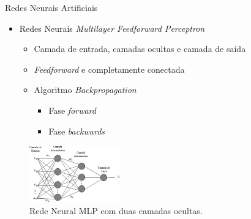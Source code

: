\begin{frame}{Redes Neurais Artificiais}
   \ \  \\[0.1cm]
   \begin{itemize}
        \item Redes Neurais \alert{\emph{Multilayer Feedforward Perceptron}}
        \begin{itemize}
          \item Camada de entrada, camadas ocultas e camada de saída
          \item \emph{Feedforward} e completamente conectada
          \item Algoritmo \emph{Backpropagation}
          \begin{itemize}
               \item Fase \emph{forward}
               \item Fase \emph{backwards}
          \end{itemize}
\end{itemize}
   \end{itemize}
   \begin{figure}[ht]
    \centering
    \label{fig:mlp}
    \includegraphics[width=0.35\textwidth]{img/mlprna.jpg}
     \caption{Rede Neural MLP com duas camadas ocultas.}
   \end{figure}
\end{frame}


